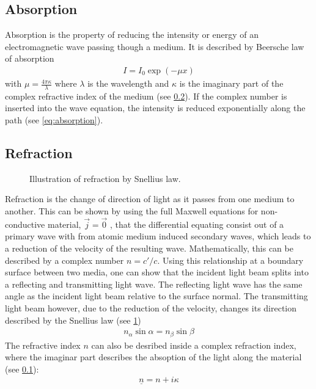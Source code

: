 \subsection{Absorption}\label{sec:theoAbsorption}
%
Absorption is the property of reducing the intensity or energy of an electromagnetic wave passing though a medium.
It is described by Beersche law of absorption
% 
\begin{align} 
    I = I_0 \exp(-\mu x) \label{eq:absorption}
\end{align}
%
with $\mu = \frac{4\pi \kappa}{\lambda}$ where $\lambda$ is the wavelength and $\kappa$ is the imaginary part of the complex refractive index of the medium (see \cref{sec:theoRefraction}).
If the complex number is inserted into the wave equation, the intensity is reduced exponentially along the path (see \cref{eq:absorption}).
%
% 
% 
\subsection{Refraction}\label{sec:theoRefraction}
%
\begin{figure}[!t]
\centering
\setlength{\tikzwidth}{\textwidth}
\caption{Illustration of refraction by Snellius law.}
\label{fig:optic_refraction}
\end{figure}
%
Refraction is the change of direction of light as it passes from one medium to another.
This can be shown by using the full Maxwell equations  for non-conductive material, \ie{} $\vec{j} = \vec{0}$ , that the differential equating consist out of a primary wave with from atomic medium induced secondary waves, which leads to a reduction of the velocity of the resulting wave.
Mathematically, this can be described by a complex number $n = c' / c$.
Using this relationship at a boundary surface between two media, one can show that the incident light beam splits into a reflecting and transmitting light wave.
The reflecting light wave has the same angle as the incident light beam relative to the surface normal.
The transmitting light beam however, due to the reduction of the velocity, changes its direction described by the Snellius law (see \cref{fig:optic_refraction})
\begin{align}
    n_\alpha \sin \alpha = n_\beta \sin \beta \label{eq:Snellius}
\end{align}
% 
The refractive index $n$ can also be desribed inside a complex refraction index, where the imaginar part describes the absoption of the light along the material (see \cref{sec:theoAbsorption}):
% 
\begin{align}
\underline{n} = n + i\kappa
\end{align}
% 
%
%
